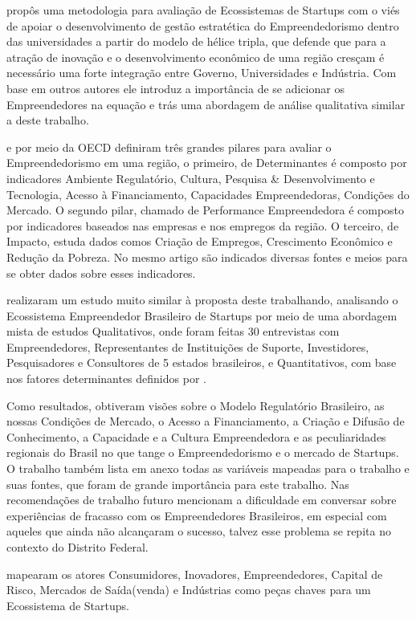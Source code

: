  propôs uma metodologia para avaliação de Ecossistemas de Startups com o viés de apoiar o desenvolvimento de gestão estratética do Empreendedorismo dentro das universidades a partir do modelo de hélice tripla, que defende que para a atração de inovação e o desenvolvimento econômico de uma região cresçam é necessário uma forte integração entre Governo, Universidades e Indústria. Com base em outros autores ele introduz a importância de se adicionar os Empreendedores na equação e trás uma abordagem de análise qualitativa similar a deste trabalho.

 e  por meio da OECD definiram três grandes pilares para avaliar o Empreendedorismo em uma região, o primeiro, de Determinantes é composto por indicadores Ambiente Regulatório, Cultura, Pesquisa \& Desenvolvimento e Tecnologia, Acesso à Financiamento, Capacidades Empreendedoras, Condições do Mercado. O segundo pilar, chamado de Performance Empreendedora é composto por indicadores baseados nas empresas e nos empregos da região. O terceiro, de Impacto, estuda dados comos Criação de Empregos, Crescimento Econômico e Redução da Pobreza. No mesmo artigo são indicados diversas fontes e meios para se obter dados sobre esses indicadores.

 realizaram um estudo muito similar à proposta deste trabalhando, analisando o Ecossistema Empreendedor Brasileiro de Startups por meio de uma abordagem mista de estudos Qualitativos, onde foram feitas 30 entrevistas com Empreendedores, Representantes de Instituições de Suporte, Investidores, Pesquisadores e Consultores de 5 estados brasileiros, e Quantitativos, com base nos fatores determinantes definidos por . 

Como resultados, obtiveram visões sobre o Modelo Regulatório Brasileiro, as nossas Condições de Mercado, o Acesso a Financiamento, a Criação e Difusão de Conhecimento, a Capacidade e a Cultura Empreendedora e as peculiaridades regionais do Brasil no que tange o Empreendedorismo e o mercado de Startups. O trabalho também lista em anexo todas as variáveis mapeadas para o trabalho e suas fontes, que foram de grande importância para este trabalho. Nas recomendações de trabalho futuro mencionam a dificuldade em conversar sobre experiências de fracasso com os Empreendedores Brasileiros, em especial com aqueles que ainda não alcançaram o sucesso, talvez esse problema se repita no contexto do Distrito Federal.

 mapearam os atores Consumidores, Inovadores, Empreendedores, Capital de Risco, Mercados de Saída(venda) e Indústrias como peças chaves para um Ecossistema de Startups. 

